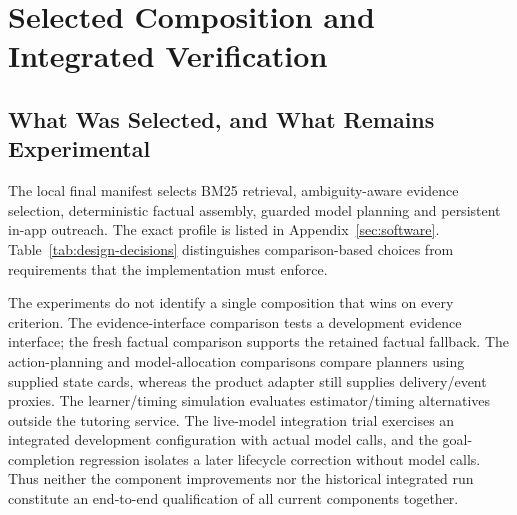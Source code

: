 \section{Selected Composition and Integrated Verification}
\label{sec:verification}
\subsection{What Was Selected, and What Remains Experimental}
The local final manifest selects BM25 retrieval, ambiguity-aware evidence
selection, deterministic factual assembly, guarded model planning and persistent
in-app outreach. The exact profile is listed in Appendix~\ref{sec:software}. Table~\ref{tab:design-decisions} distinguishes
comparison-based choices from requirements that the implementation must enforce.

The experiments do not identify a single composition that wins on every
criterion. The evidence-interface comparison tests a development evidence interface; the fresh factual comparison supports
the retained factual fallback. The action-planning and model-allocation comparisons compare planners using supplied
state cards, whereas the product adapter still supplies delivery/event proxies.
The learner/timing simulation evaluates estimator/timing alternatives outside the tutoring service.
The live-model integration trial exercises an integrated development configuration with actual model
calls, and the goal-completion regression isolates a later lifecycle correction without model calls.
Thus neither the component improvements nor the historical integrated run
constitute an end-to-end qualification of all current components together.


